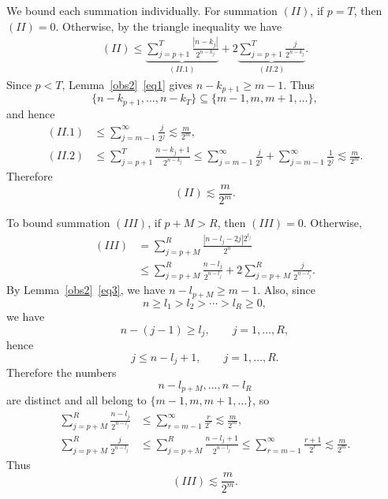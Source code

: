 \documentclass[11pt]{amsart}
\theoremstyle{definition}
\renewcommand{\1}{{\mathbbm{1}}}
\begin{document}
We bound each summation individually. For summation $(II)$, if $p=T$, then
$(II)=0$. Otherwise, by the triangle inequality we have
\begin{align*}
    (II)\leq 
    \underbrace{\sum_{j=p+1}^{T} \frac{|n-k_j|}{2^{n-k_j}}}_{(II.1)}
    +2\underbrace{\sum_{j=p+1}^{T} \frac{j}{2^{n-k_j}}}_{(II.2)}.
\end{align*}
Since $p<T$, Lemma~\ref{obs2}~\eqref{eq1} gives $n-k_{p+1}\ge m-1$. Thus
\[
\{n-k_{p+1},\dots,n-k_T\}\subseteq \{m-1,m,m+1,\dots\},
\]
and hence
\begin{align*}
    (II.1)
    &\le \sum_{j=m-1}^{\infty}\frac{j}{2^j}
    \lesssim \frac{m}{2^m},\\
    (II.2)
    &\le \sum_{j=p+1}^{T}\frac{n-k_j+1}{2^{n-k_j}}
    \le \sum_{j=m-1}^{\infty}\frac{j}{2^j}
      +\sum_{j=m-1}^{\infty}\frac{1}{2^j}
    \lesssim \frac{m}{2^m}.
\end{align*}
Therefore
\[
(II)\lesssim \frac{m}{2^m}.
\]

To bound summation $(III)$, if $p+M>R$, then $(III)=0$. Otherwise,
\begin{align*}
(III)
&=\sum_{j=p+M}^{R} \frac{|n-l_j - 2j|2^{l_j}}{2^n} \\
&\le \sum_{j=p+M}^{R} \frac{n-l_j}{2^{n-l_j}}
+ 2 \sum_{j=p+M}^{R} \frac{j}{2^{n-l_j}}.
\end{align*}
By Lemma~\ref{obs2}~\eqref{eq3}, we have $n-l_{p+M}\ge m-1$. Also, since
\[
n\ge l_1>l_2>\cdots>l_R\ge 0,
\]
we have
\[
n-(j-1)\ge l_j,\qquad j=1,\dots,R,
\]
hence
\[
j\le n-l_j+1,\qquad j=1,\dots,R.
\]
Therefore the numbers
\[
n-l_{p+M},\dots,n-l_R
\]
are distinct and all belong to $\{m-1,m,m+1,\dots\}$, so
\begin{align*}
\sum_{j=p+M}^{R} \frac{n-l_j}{2^{n-l_j}}
&\le \sum_{r=m-1}^{\infty}\frac{r}{2^r}
\lesssim \frac{m}{2^m},\\
\sum_{j=p+M}^{R} \frac{j}{2^{n-l_j}}
&\le \sum_{j=p+M}^{R} \frac{n-l_j+1}{2^{n-l_j}}
\le \sum_{r=m-1}^{\infty}\frac{r+1}{2^r}
\lesssim \frac{m}{2^m}.
\end{align*}
Thus
\[
(III)\lesssim \frac{m}{2^m}.
\]
\end{document}
